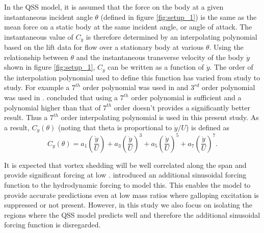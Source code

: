 In the QSS model, it is assumed that the force on the body at a given instantaneous incident angle $\theta$ (defined in figure \ref{fig:setup_1}) is the same as the mean force on a static body at the same incident angle, or angle of attack. The instantaneous value of $C_y$ is therefore determined by an interpolating polynomial based on the lift data for flow over a stationary body at various $\theta$. Using the relationship between $\theta$ and the instantaneous transverse velocity of the body $\dot{y}$ shown in figure \ref{fig:setup_1}, $C_y$ can be written as a function of $\dot{y}$. The order of the interpolation polynomial used to define this function has varied from study to study. For  example a $7^{th}$ order polynomial was used in \cite{Parkinson1964} and $3^{rd}$ order polynomial was used in \cite{Barrero-Gil2009}. \cite{Ng2005} concluded that using a $7^{th}$ order polynomial is sufficient and a polynomial higher than that of $7^{th}$ order doesn't provides a significantly better result. Thus a $7 ^{th}$ order interpolating polynomial is used in this present study. As a result, $C_y(\theta)$ (noting that theta is proportional to $\dot{y}/U$) is defined as
\begin{equation}
\label{cy ploynomial}
C_y(\theta)=a_1\left(\frac{\dot{y}}{U}\right)+a_3\left(\frac{\dot{y}}{U}\right)^3+a_5\left(\frac{\dot{y}}{U}\right)^5+a_7\left(\frac{\dot{y}}{U}\right)^7.
\end{equation}


 It is expected that vortex shedding will be well correlated along the span and provide significant forcing at low \reynoldsnumber. \citet{Joly2012} introduced  an additional sinusoidal forcing function to the hydrodynamic forcing to model this. This enables the model to provide accurate predictions even at low mass ratios where galloping excitation is suppressed or not present. However, in this study we also focus on isolating the regions where the QSS model predicts well and therefore the additional sinusoidal forcing function is disregarded.  
 
 
 
\begin{equation}
\end{equation}

